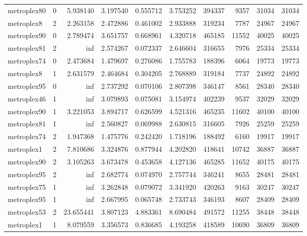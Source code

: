 \begin{longtable}{|l|r|r|r|r|r|r|r|r|r|}
metroplex80 & 0 & 5.938140 & 3.197540 & 0.555712 & 3.753252 & 394337 & 9357 & 31034 & 31034 \\
metroplex8 & 2 & 2.263158 & 2.472886 & 0.461002 & 2.933888 & 319234 & 7787 & 24967 & 24967 \\
metroplex90 & 0 & 2.789474 & 3.651757 & 0.668961 & 4.320718 & 465185 & 11552 & 40025 & 40025 \\
metroplex81 & 2 & inf & 2.574267 & 0.072337 & 2.646604 & 316655 & 7976 & 25334 & 25334 \\
metroplex74 & 0 & 2.473684 & 1.479697 & 0.276086 & 1.755783 & 188396 & 6064 & 19773 & 19773 \\
metroplex8 & 1 & 2.631579 & 2.464684 & 0.304205 & 2.768889 & 319184 & 7737 & 24892 & 24892 \\
metroplex95 & 0 & inf & 2.737292 & 0.070106 & 2.807398 & 346147 & 8561 & 28340 & 28340 \\
metroplex46 & 1 & inf & 3.079893 & 0.075081 & 3.154974 & 402239 & 9537 & 32029 & 32029 \\
metroplex90 & 1 & 3.221053 & 3.894717 & 0.626599 & 4.521316 & 465235 & 11602 & 40100 & 40100 \\
metroplex81 & 1 & inf & 2.560827 & 0.069988 & 2.630815 & 316605 & 7926 & 25259 & 25259 \\
metroplex74 & 2 & 1.947368 & 1.475776 & 0.242420 & 1.718196 & 188492 & 6160 & 19917 & 19917 \\
metroplex1 & 2 & 7.810686 & 3.324876 & 0.877944 & 4.202820 & 418641 & 10742 & 36887 & 36887 \\
metroplex90 & 2 & 3.105263 & 3.673478 & 0.453658 & 4.127136 & 465285 & 11652 & 40175 & 40175 \\
metroplex95 & 2 & inf & 2.682774 & 0.074970 & 2.757744 & 346241 & 8655 & 28481 & 28481 \\
metroplex75 & 1 & inf & 3.262848 & 0.079072 & 3.341920 & 420263 & 9163 & 30247 & 30247 \\
metroplex95 & 1 & inf & 2.667995 & 0.065748 & 2.733743 & 346193 & 8607 & 28409 & 28409 \\
metroplex53 & 2 & 23.655441 & 3.807123 & 4.883361 & 8.690484 & 491572 & 11255 & 38448 & 38448 \\
metroplex1 & 1 & 8.079559 & 3.356573 & 0.836685 & 4.193258 & 418589 & 10690 & 36809 & 36809 \\
\end{longtable}
